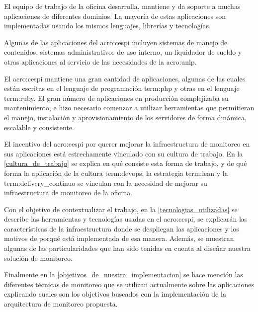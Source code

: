 El equipo de trabajo de la oficina desarrolla, mantiene y da soporte a muchas
aplicaciones de diferentes dominios. La mayoría de estas aplicaciones son
implementadas usando los mismos lenguajes, librerías y tecnologías.

Algunas de las aplicaciones del \gls{acro:cespi} incluyen sistemas de manejo de
contenidos, sistemas administrativos de uso interno, un liquidador de sueldo y
otras aplicaciones al servicio de las necesidades de la \gls{acro:unlp}.

El \gls{acro:cespi} mantiene una gran cantidad de aplicaciones, algunas de las
cuales están escritas en el lenguaje de programación \gls{term:php} y otras en
el lenguaje \gls{term:ruby}. El gran número de aplicaciones en producción
complejizaba su mantenimiento, e hizo necesario comenzar a utilizar
herramientas que permitieran el manejo, instalación y aprovisionamiento de los
servidores de forma dinámica, escalable y consistente.

El incentivo del \gls{acro:cespi} por querer mejorar la infraestructura de
monitoreo en sus aplicaciones está estrechamente vinculado con su cultura de
trabajo. En la \autoref{cultura_de_trabajo} se explica en qué consiste esta
forma de trabajo, y de qué forma la aplicación de la cultura \gls{term:devops},
la estrategia \gls{term:lean} y la \gls{term:delivery_continuo} se vinculan con
la necesidad de mejorar su infraestructura de monitoreo de la oficina.

Con el objetivo de contextualizar el trabajo, en la
\autoref{tecnologias_utilizadas} se describe las herramientas y tecnologías
usadas en el \gls{acro:cespi}, se explicarán las características de la
infraestructura donde se despliegan las aplicaciones y los motivos de porqué
está implementada de esa manera. Además, se muestran algunas de las
particularidades que han sido tenidas en cuenta al diseñar nuestra solución de
monitoreo.

Finalmente en la \autoref{objetivos_de_nuestra_implementacion} se hace mención
las diferentes técnicas de monitoreo que se utilizan actualmente sobre las
aplicaciones explicando cuales son los objetivos buscados con la
implementación de la arquitectura de monitoreo propuesta.
